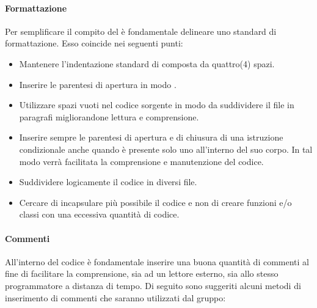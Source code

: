 \paragraph{Formattazione}
Per semplificare il compito del \textit{\Progr} è fondamentale delineare uno standard di formattazione.
Esso coincide nei seguenti punti:

\begin{itemize}
\item Mantenere l'indentazione standard di  composta da quattro(4) spazi.

\item Inserire le parentesi di apertura in modo .

\item Utilizzare spazi vuoti nel codice sorgente in modo da suddividere il file in paragrafi migliorandone lettura e comprensione.

\item Inserire sempre le parentesi di apertura e di chiusura di una istruzione condizionale anche quando è presente solo uno  all'interno del suo corpo. In tal modo verrà facilitata la comprensione e manutenzione del codice.

\item Suddividere logicamente il codice in diversi file.

\item Cercare di incapsulare più possibile il codice e non di creare funzioni e/o classi con una eccessiva quantità di codice.
\end{itemize}

\paragraph{Commenti}
All'interno del codice è fondamentale inserire una buona quantità di commenti al fine di facilitare la comprensione, sia ad un lettore esterno, sia allo stesso programmatore a distanza di tempo.
Di seguito sono suggeriti alcuni metodi di inserimento di commenti che saranno utilizzati dal gruppo:

